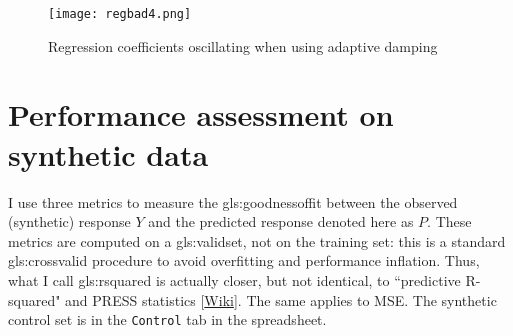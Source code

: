 \documentclass[oneside,10pt]{book}
\begin{document}
\begin{figure}%
\centering
\texttt{[image: regbad4.png]}
\caption{Regression coefficients oscillating when using adaptive damping}
\label{fig:regdash}
\end{figure}


\section{Performance assessment on synthetic data}\label{pasr}


I use three metrics to measure the  \gls{gls:goodnessoffit} between the observed (synthetic) response $Y$ and the predicted response denoted here as $P$. These metrics are computed on a \gls{gls:validset},
not on the training set: this is a standard \gls{gls:crossvalid} procedure to avoid overfitting and performance inflation. Thus, what I call \gls{gls:rsquared} is actually closer, but not identical,  to
``predictive R-squared" and PRESS statistics [\href{https://en.wikipedia.org/wiki/PRESS_statistic}{Wiki}]. The same applies to MSE.
The synthetic control set is in the \texttt{Control} tab in the spreadsheet.
\end{document}
